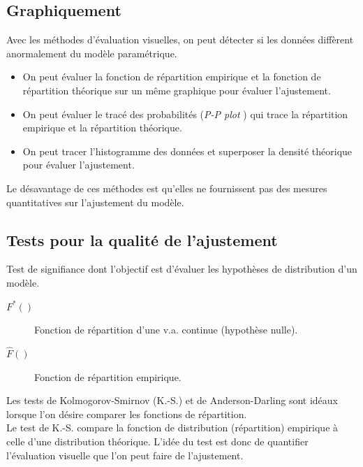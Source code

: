 \documentclass[10pt, french]{article}
\begin{document}
\begin{multicols*}{2}
\subsection{Graphiquement}
Avec les méthodes d'évaluation visuelles, on peut détecter si les données diffèrent anormalement du modèle paramétrique.
\begin{itemize}
	\item	On peut évaluer la fonction de répartition empirique et la fonction de répartition théorique sur un même graphique pour évaluer l'ajustement.
	\item	On peut évaluer le tracé des probabilités (\og \textit{P-P plot} \fg{}) qui trace la répartition empirique et la répartition théorique.
	\item	On peut tracer l'histogramme des données et superposer la densité théorique pour évaluer l'ajustement.
\end{itemize}

Le désavantage de ces méthodes est qu'elles ne fournissent pas des mesures quantitatives sur l'ajustement du modèle.


\subsection{Tests pour la qualité de l'ajustement}
\begin{definitionNOHFILL}
Test de signifiance dont l'objectif est d'évaluer les hypothèses de distribution d'un modèle.

\end{definitionNOHFILL}

\begin{distributions}[Notation]
\begin{description}
	\item[$F^{\ast}()$]	Fonction de répartition d'une v.a. continue (hypothèse nulle).
	\item[$\hat{F}()$]	Fonction de répartition empirique.
\end{description}
\end{distributions}

Les tests de Kolmogorov-Smirnov (K.-S.) et de Anderson-Darling sont idéaux lorsque l'on désire comparer les fonctions de répartition. \\

Le test de K.-S. compare la fonction de distribution (répartition) empirique à celle d'une distribution théorique. L'idée du test est donc de quantifier l'évaluation visuelle que l'on peut faire de l'ajustement.


\end{multicols*}
\end{document}
